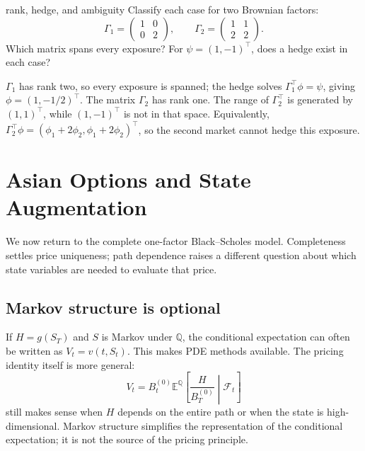 \documentclass[10pt]{article}
\newcommand{\E}{\mathbb E}
\newcommand{\Q}{\mathbb Q}
\newcommand{\1}{\mathbf 1}
\newcommand{\cF}{\mathcal F}
\theoremstyle{definition}
\begin{document}
\begin{studentexercise}{rank, hedge, and ambiguity}
Classify each case for two Brownian factors:
\[
\Gamma_1=
\begin{pmatrix}1&0\\0&2\end{pmatrix},
\qquad
\Gamma_2=
\begin{pmatrix}1&1\\2&2\end{pmatrix}.
\]
Which matrix spans every exposure? For \(\psi=(1,-1)^\top\), does a hedge
exist in each case?
\end{studentexercise}
\begin{shortsolution}
\(\Gamma_1\) has rank two, so every exposure is spanned; the hedge solves
\(\Gamma_1^\top\phi=\psi\), giving
\(\phi=(1,-1/2)^\top\). The matrix \(\Gamma_2\) has rank one. The range of
\(\Gamma_2^\top\) is generated by \((1,1)^\top\), while
\((1,-1)^\top\) is not in that space. Equivalently,
\(\Gamma_2^\top\phi=(\phi_1+2\phi_2,\phi_1+2\phi_2)^\top\), so the second
market cannot hedge this exposure.
\end{shortsolution}

\section{Asian Options and State Augmentation}

We now return to the complete one-factor Black--Scholes model. Completeness
settles price uniqueness; path dependence raises a different question about
which state variables are needed to evaluate that price.

\subsection{Markov structure is optional}

If \(H=g(S_T)\) and \(S\) is Markov under \(\Q\), the conditional expectation
can often be written as \(V_t=v(t,S_t)\). This makes PDE methods available.
The pricing identity itself is more general:
\[
V_t=B_t^{(0)}
\E^\Q\left[\frac{H}{B_T^{(0)}}\middle|\cF_t\right]
\]
still makes sense when \(H\) depends on the entire path or when the state is
high-dimensional. Markov structure simplifies the representation of the
conditional expectation; it is not the source of the pricing principle.
\end{document}
